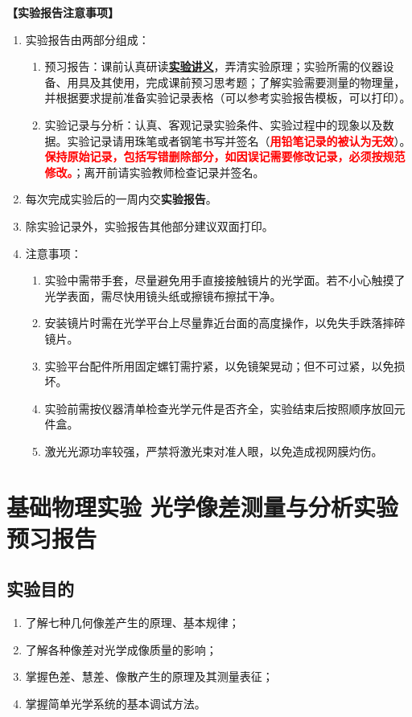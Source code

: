 \documentclass[dvipsnames, svgnames,a4paper,11pt]{article}
\begin{document}
\textbf{【实验报告注意事项】}
\begin{enumerate}
	\item 实验报告由两部分组成：
	\begin{enumerate}
		\item 预习报告：课前认真研读\underline{\textbf{实验讲义}}，弄清实验原理；实验所需的仪器设备、用具及其使用，完成课前预习思考题；了解实验需要测量的物理量，并根据要求提前准备实验记录表格（可以参考实验报告模板，可以打印）。
	    \item 实验记录与分析：认真、客观记录实验条件、实验过程中的现象以及数据。实验记录请用珠笔或者钢笔书写并签名（\textcolor{red}{\textbf{用铅笔记录的被认为无效}}）。\textcolor{red}{\textbf{保持原始记录，包括写错删除部分，如因误记需要修改记录，必须按规范修改。}}；离开前请实验教师检查记录并签名。
	\end{enumerate}
	\item 每次完成实验后的一周内交\textbf{实验报告}。
	\item 除实验记录外，实验报告其他部分建议双面打印。
	\item 注意事项：
	\begin{enumerate}
	\item 实验中需带手套，尽量避免用手直接接触镜片的光学面。若不小心触摸了光学表面，需尽快用镜头纸或擦镜布擦拭干净。
	\item 安装镜片时需在光学平台上尽量靠近台面的高度操作，以免失手跌落摔碎镜片。
	\item 实验平台配件所用固定螺钉需拧紧，以免镜架晃动；但不可过紧，以免损坏。
	\item 实验前需按仪器清单检查光学元件是否齐全，实验结束后按照顺序放回元件盒。
	\item 激光光源功率较强，严禁将激光束对准人眼，以免造成视网膜灼伤。
\end{enumerate}

\end{enumerate}


\clearpage

\setcounter{section}{0}
\section{基础物理实验 \quad 光学像差测量与分析实验 \heiti 预习报告}

	
\subsection{实验目的}
\begin{enumerate}
	\item 了解七种几何像差产生的原理、基本规律；
	\item 了解各种像差对光学成像质量的影响；
	\item 掌握色差、慧差、像散产生的原理及其测量表征；
	\item 掌握简单光学系统的基本调试方法。
\end{enumerate}
\end{document}
